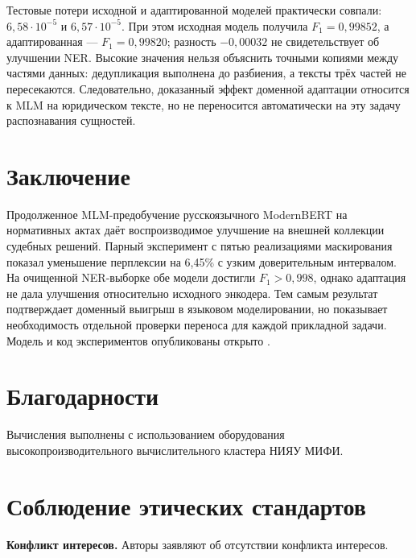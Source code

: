 \documentclass[12pt,a4paper]{article}
\begin{document}
Тестовые потери исходной и адаптированной моделей практически совпали: $6{,}58\cdot10^{-5}$ и $6{,}57\cdot10^{-5}$. При этом исходная модель получила $F_1=0{,}99852$, а адаптированная --- $F_1=0{,}99820$; разность $-0{,}00032$ не свидетельствует об улучшении NER. Высокие значения нельзя объяснить точными копиями между частями данных: дедупликация выполнена до разбиения, а тексты трёх частей не пересекаются. Следовательно, доказанный эффект доменной адаптации относится к MLM на юридическом тексте, но не переносится автоматически на эту задачу распознавания сущностей.

\section{Заключение}
Продолженное MLM-предобучение русскоязычного ModernBERT на нормативных актах даёт воспроизводимое улучшение на внешней коллекции судебных решений. Парный эксперимент с пятью реализациями маскирования показал уменьшение перплексии на 6{,}45\% с узким доверительным интервалом. На очищенной NER-выборке обе модели достигли $F_1>0{,}998$, однако адаптация не дала улучшения относительно исходного энкодера. Тем самым результат подтверждает доменный выигрыш в языковом моделировании, но показывает необходимость отдельной проверки переноса для каждой прикладной задачи. Модель и код экспериментов опубликованы открыто \cite{modelcard,repository}.

\section*{Благодарности}
Вычисления выполнены с использованием оборудования высокопроизводительного вычислительного кластера НИЯУ МИФИ.

\section*{Соблюдение этических стандартов}
\noindent\textbf{Конфликт интересов.} Авторы заявляют об отсутствии конфликта интересов.
\end{document}
